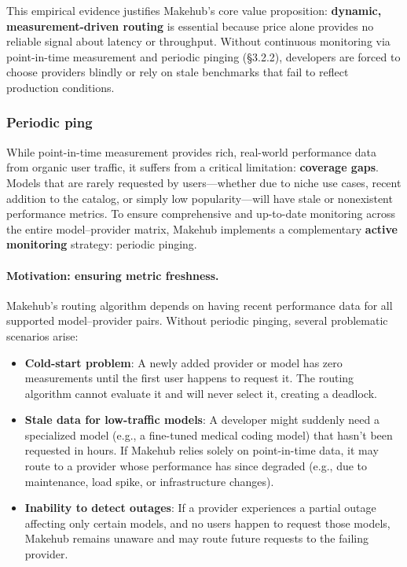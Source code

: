 \documentclass[english]{article}
\begin{document}
This empirical evidence justifies Makehub's core value proposition: \textbf{dynamic, measurement-driven routing} is essential because price alone provides no reliable signal about latency or throughput. Without continuous monitoring via point-in-time measurement and periodic pinging (§3.2.2), developers are forced to choose providers blindly or rely on stale benchmarks that fail to reflect production conditions.


\subsubsection{Periodic ping}
\label{sec:periodic_ping}

While point-in-time measurement provides rich, real-world performance data from organic user traffic, it suffers from a critical limitation: \textbf{coverage gaps}. Models that are rarely requested by users—whether due to niche use cases, recent addition to the catalog, or simply low popularity—will have stale or nonexistent performance metrics. To ensure comprehensive and up-to-date monitoring across the entire model–provider matrix, Makehub implements a complementary \textbf{active monitoring} strategy: periodic pinging.

\paragraph{Motivation: ensuring metric freshness.}

Makehub's routing algorithm depends on having recent performance data for all supported model–provider pairs. Without periodic pinging, several problematic scenarios arise:
\begin{itemize}
    \item \textbf{Cold-start problem}: A newly added provider or model has zero measurements until the first user happens to request it. The routing algorithm cannot evaluate it and will never select it, creating a deadlock.
    \item \textbf{Stale data for low-traffic models}: A developer might suddenly need a specialized model (e.g., a fine-tuned medical coding model) that hasn't been requested in hours. If Makehub relies solely on point-in-time data, it may route to a provider whose performance has since degraded (e.g., due to maintenance, load spike, or infrastructure changes).
    \item \textbf{Inability to detect outages}: If a provider experiences a partial outage affecting only certain models, and no users happen to request those models, Makehub remains unaware and may route future requests to the failing provider.
\end{itemize}
\end{document}
